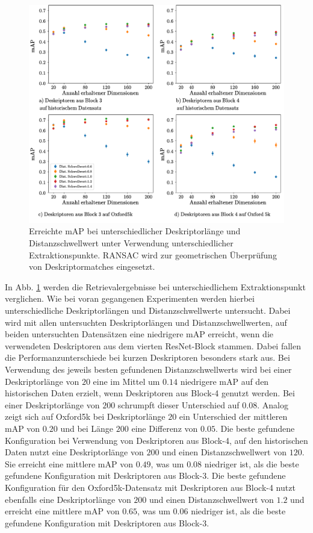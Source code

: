 \\
\begin{figure}
\includegraphics[scale=0.73]{mAP_layer_diff_ransac}
\caption{Erreichte mAP bei unterschiedlicher Deskriptorlänge und Distanzschwellwert unter Verwendung unterschiedlicher Extraktionspunkte.
RANSAC wird zur geometrischen Überprüfung von Deskriptormatches eingesetzt.}
\label{mAP_layer_diff_ransac}
\end{figure}
In Abb. \ref{mAP_layer_diff_ransac} werden die Retrievalergebnisse bei unterschiedlichem Extraktionspunkt verglichen. Wie bei voran gegangenen Experimenten werden hierbei unterschiedliche Deskriptorlängen und Distanzschwellwerte untersucht. Dabei wird mit allen untersuchten Deskriptorlängen und Distanzschwellwerten, auf beiden untersuchten Datensätzen eine niedrigere mAP erreicht, wenn die verwendeten Deskriptoren aus dem vierten ResNet-Block stammen. Dabei fallen die Performanzunterschiede bei kurzen Deskriptoren besonders stark aus. Bei Verwendung des jeweils besten gefundenen Distanzschwellwerts wird bei einer Deskriptorlänge von $20$ eine im Mittel um $0.14$ niedrigere mAP auf den historischen Daten erzielt, wenn Deskriptoren aus Block-4 genutzt werden. Bei einer Deskriptorlänge von $200$ schrumpft dieser Unterschied auf $0.08$. Analog zeigt sich auf Oxford5k bei Deskriptorlänge $20$ ein Unterschied der mittleren mAP von $0.20$ und bei Länge $200$ eine Differenz von $0.05$. Die beste gefundene Konfiguration bei Verwendung von Deskriptoren aus Block-4, auf den historischen Daten nutzt eine Deskriptorlänge von $200$ und einen Distanzschwellwert von $120$. Sie erreicht eine mittlere mAP von $0.49$, was um $0.08$ niedriger ist, als die beste gefundene Konfiguration mit Deskriptoren aus Block-3. Die beste gefundene Konfiguration für den Oxford5k-Datensatz mit Deskriptoren aus Block-4 nutzt ebenfalls eine Deskriptorlänge von $200$ und einen Distanzschwellwert von $1.2$ und erreicht eine mittlere mAP von $0.65$, was um $0.06$ niedriger ist, als die beste gefundene Konfiguration mit Deskriptoren aus Block-3.
